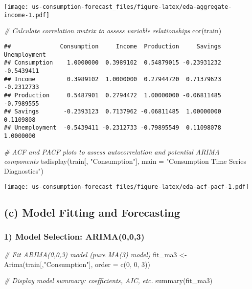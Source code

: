 \documentclass[
  12pt,
]{article}
\newenvironment{Shaded}{\begin{snugshade}}{\end{snugshade}}
\newcommand{\AttributeTok}[1]{\textcolor[rgb]{0.77,0.63,0.00}{#1}}
\newcommand{\CommentTok}[1]{\textcolor[rgb]{0.56,0.35,0.01}{\textit{#1}}}
\newcommand{\DecValTok}[1]{\textcolor[rgb]{0.00,0.00,0.81}{#1}}
\newcommand{\FunctionTok}[1]{\textcolor[rgb]{0.00,0.00,0.00}{#1}}
\newcommand{\NormalTok}[1]{#1}
\newcommand{\OtherTok}[1]{\textcolor[rgb]{0.56,0.35,0.01}{#1}}
\newcommand{\StringTok}[1]{\textcolor[rgb]{0.31,0.60,0.02}{#1}}
\begin{document}
\texttt{[image: us-consumption-forecast\_files/figure-latex/eda-aggregate-income-1.pdf]}

\begin{Shaded}
\begin{Highlighting}[]
\CommentTok{\# Calculate correlation matrix to assess variable relationships}
\FunctionTok{cor}\NormalTok{(train)}
\end{Highlighting}
\end{Shaded}

\begin{verbatim}
##              Consumption     Income  Production     Savings Unemployment
## Consumption    1.0000000  0.3989102  0.54879015 -0.23931232   -0.5439411
## Income         0.3989102  1.0000000  0.27944720  0.71379623   -0.2312733
## Production     0.5487901  0.2794472  1.00000000 -0.06811485   -0.7989555
## Savings       -0.2393123  0.7137962 -0.06811485  1.00000000    0.1109808
## Unemployment  -0.5439411 -0.2312733 -0.79895549  0.11098078    1.0000000
\end{verbatim}

\begin{Shaded}
\begin{Highlighting}[]
\CommentTok{\# ACF and PACF plots to assess autocorrelation and potential ARIMA components}
\FunctionTok{tsdisplay}\NormalTok{(train[, }\StringTok{"Consumption"}\NormalTok{], }\AttributeTok{main =} \StringTok{"Consumption Time Series Diagnostics"}\NormalTok{)}
\end{Highlighting}
\end{Shaded}

\texttt{[image: us-consumption-forecast\_files/figure-latex/eda-acf-pacf-1.pdf]}

\hypertarget{c-model-fitting-and-forecasting}{%
\subsection{(c) Model Fitting and
Forecasting}\label{c-model-fitting-and-forecasting}}

\hypertarget{model-selection-arima003}{%
\subsubsection{1) Model Selection:
ARIMA(0,0,3)}\label{model-selection-arima003}}

\begin{Shaded}
\begin{Highlighting}[]
\CommentTok{\# Fit ARIMA(0,0,3) model (pure MA(3) model)}
\NormalTok{fit\_ma3 }\OtherTok{\textless{}{-}} \FunctionTok{Arima}\NormalTok{(train[,}\StringTok{"Consumption"}\NormalTok{], }\AttributeTok{order =} \FunctionTok{c}\NormalTok{(}\DecValTok{0}\NormalTok{, }\DecValTok{0}\NormalTok{, }\DecValTok{3}\NormalTok{))}

\CommentTok{\# Display model summary: coefficients, AIC, etc.}
\FunctionTok{summary}\NormalTok{(fit\_ma3)}
\end{Highlighting}
\end{Shaded}
\end{document}

